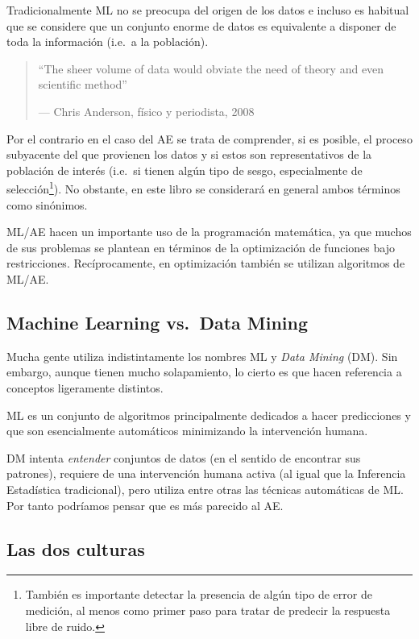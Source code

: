 \documentclass[
]{book}
\theoremstyle{break}
\theoremstyle{nonumberplain}
\begin{document}
Tradicionalmente ML no se preocupa del origen de los datos e incluso es habitual que se considere que un conjunto enorme de datos es equivalente a disponer de toda la información (i.e.~a la población).

\begin{quote}
``The sheer volume of data would obviate the need of theory and even scientific method''

--- Chris Anderson, físico y periodista, 2008
\end{quote}

Por el contrario en el caso del AE se trata de comprender, si es posible, el proceso subyacente del que provienen los datos y si estos son representativos de la población de interés (i.e.~si tienen algún tipo de sesgo, especialmente de selección\footnote{También es importante detectar la presencia de algún tipo de error de medición, al menos como primer paso para tratar de predecir la respuesta libre de ruido.}).
No obstante, en este libro se considerará en general ambos términos como sinónimos.

ML/AE hacen un importante uso de la programación matemática, ya que muchos de sus problemas se plantean en términos de la optimización de funciones bajo restricciones.
Recíprocamente, en optimización también se utilizan algoritmos de ML/AE.

\hypertarget{machine-learning-vs.-data-mining}{%
\subsection{Machine Learning vs.~Data Mining}\label{machine-learning-vs.-data-mining}}

Mucha gente utiliza indistintamente los nombres ML y \emph{Data Mining} (DM).
Sin embargo, aunque tienen mucho solapamiento, lo cierto es que hacen referencia a conceptos ligeramente distintos.

ML es un conjunto de algoritmos principalmente dedicados a hacer predicciones y que son esencialmente automáticos minimizando la intervención humana.

DM intenta \emph{entender} conjuntos de datos (en el sentido de encontrar sus patrones), requiere de una intervención humana activa (al igual que la Inferencia Estadística tradicional), pero utiliza entre otras las técnicas automáticas de ML.
Por tanto podríamos pensar que es más parecido al AE.

\hypertarget{las-dos-culturas}{%
\subsection{Las dos culturas}\label{las-dos-culturas}}
\end{document}
